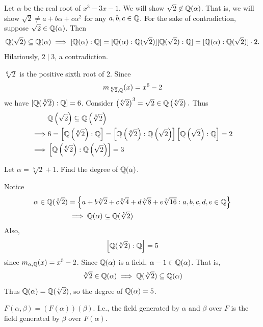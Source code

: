 \begin{example}
    Let $\alpha$ be the real root of $x^3-3x-1.$ We will show $\sqrt{2} \not \in \mathbb{Q}(\alpha)$. That is, we will show $\sqrt{2} \neq a+b\alpha + c\alpha^2$ for any $a,b,c \in \mathbb{Q}$.
    For the sake of contradiction, suppose $\sqrt{2} \in \mathbb{Q}(\alpha)$. Then
    $$\mathbb{Q}(\sqrt{2})\subseteq \mathbb{Q}(\alpha) \implies [\mathbb{Q}(\alpha) : \mathbb{Q}] = [\mathbb{Q}(\alpha) : \mathbb{Q}(\sqrt{2})][\mathbb{Q}(\sqrt{2}): \mathbb{Q}] = [\mathbb{Q}(\alpha) : \mathbb{Q}(\sqrt{2})] \cdot 2.$$
    Hilariously, $2\mid 3$, a contradiction.
\end{example}

\begin{example}
    $\sqrt[6]{2}$ is the positive sixth root of $2$. Since
    $$m_{\sqrt[6]{2}, \mathbb{Q}}(x) = x^6-2$$
    we have $[\mathbb{Q}(\sqrt[6]{2}) : \mathbb{Q}]=6$. Consider $\left(\sqrt[6]{2}\right)^3=\sqrt{2}\in \mathbb{Q}\left(\sqrt[6]{2}\right).$ Thus
    \begin{align*}
        &\mathbb{Q}\left(\sqrt{2}\right) \subseteq \mathbb{Q}\left(\sqrt[6]{2}\right) \\
        \implies &6=\left[\mathbb{Q}\left(\sqrt[6]{2}\right):\mathbb{Q}\right] = \left[\mathbb{Q}\left(\sqrt[6]{2}\right) : \mathbb{Q}\left(\sqrt{2}\right)\right]\left[\mathbb{Q}\left(\sqrt{2}\right) : \mathbb{Q}\right] = 2 \\
        \implies &\left[\mathbb{Q}\left(\sqrt[6]{2}\right):\mathbb{Q}\left(\sqrt{2}\right)\right] = 3
    \end{align*}
\end{example}

\begin{example}
    Let $\alpha = \sqrt[5]{2} + 1$. Find the degree of $\mathbb{Q}(\alpha)$.

    Notice
    \begin{align*}
        \alpha \in \mathbb{Q}(\sqrt[5]{2}) &= \left\{a+b\sqrt[5]{2}+c\sqrt[5]{4}+d\sqrt[5]{8}+e\sqrt[5]{16} : a,b,c,d,e \in \mathbb{Q}\right\} \\
        &\implies \mathbb{Q}(\alpha) \subseteq \mathbb{Q}(\sqrt[5]{2})
    \end{align*}
    Also,
    $$\left[\mathbb{Q}(\sqrt[5]{2}):\mathbb{Q}\right] = 5$$
    since $m_{\alpha, \mathbb{Q}}(x)=x^5-2$. Since $\mathbb{Q}(\alpha)$ is a field, $\alpha - 1 \in \mathbb{Q}(\alpha)$. That is,
    $$\sqrt[5]{2}\in \mathbb{Q}(\alpha) \implies \mathbb{Q}(\sqrt[5]{2}) \subseteq \mathbb{Q}(\alpha)$$
    Thus $\mathbb{Q}(\alpha) = \mathbb{Q}(\sqrt[5]{2})$, so the degree of $\mathbb{Q}(\alpha) = 5$.
\end{example}

\begin{lemma}
    $F(\alpha, \beta) = \left(F(\alpha)\right)(\beta)$. I.e., the field generated by $\alpha$ and $\beta$ over $F$ is the field generated by $\beta$ over $F(\alpha)$.
\end{lemma}

